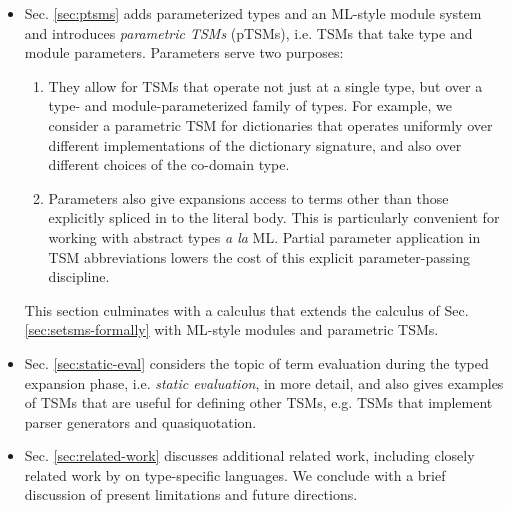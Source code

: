 \documentclass[acmlarge,review,anonymous]{acmart}\settopmatter{printfolios=true}
\begin{document}
\begin{itemize}
\item Sec. \ref{sec:ptsms} adds parameterized types and an ML-style module system and introduces \emph{parametric TSMs} (pTSMs), i.e. TSMs that take type and module parameters. Parameters serve two purposes:
\begin{enumerate}
\item They allow for TSMs that operate not just at a single type, but over a type- and module-parameterized family of types. For example, we consider a parametric TSM for dictionaries that operates uniformly over different implementations of the dictionary signature, and also over different choices of the co-domain type.
\item Parameters also give expansions access to terms other than those explicitly spliced in to the literal body. This is particularly convenient for working with abstract types \emph{a la} ML. Partial parameter application in TSM abbreviations lowers the cost of this explicit parameter-passing discipline.
\end{enumerate}
This section culminates with a calculus that extends the calculus of Sec. \ref{sec:setsms-formally} with ML-style modules and parametric TSMs.
\item Sec. \ref{sec:static-eval} considers the topic of term evaluation during the typed expansion phase, i.e. \emph{static evaluation}, in  more detail, and also gives examples of TSMs that are useful for defining other TSMs, e.g. TSMs that implement parser generators and quasiquotation.
\item Sec. \ref{sec:related-work} discusses additional related work, including closely related work by \citet{TSLs,sac15} on type-specific languages. We conclude with a brief discussion of present limitations and future directions.
\end{itemize}
\end{document}
